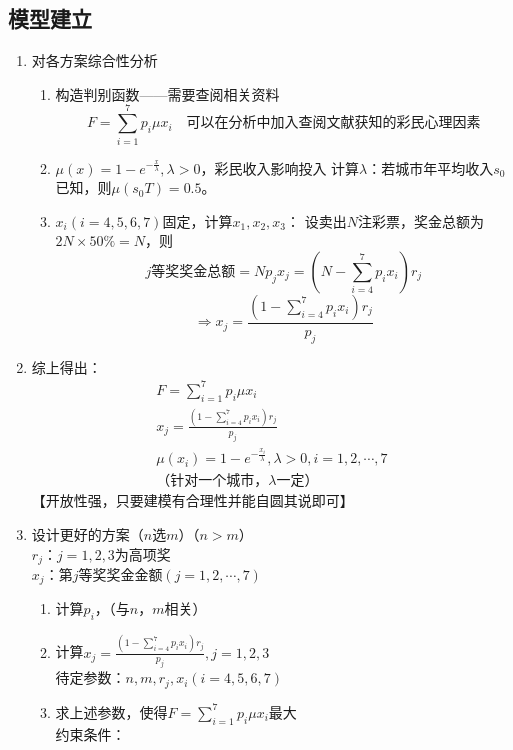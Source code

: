 \subsection{模型建立}
{
	\renewcommand{\labelenumii}{\Roman{enumii}.}
	\renewcommand{\theenumiii}{\arabic{enumiii}}
	\renewcommand{\labelenumiii}{\textcircled{\theenumiii}}
	\begin{enumerate}
		\item 对各方案综合性分析
		\begin{enumerate}
			\item 构造判别函数——需要查阅相关资料
			\[F = \sum_{i=1}^7 p_i \mu{x_i} \quad \text{可以在分析中加入查阅文献获知的彩民心理因素}
			\]
			\item $\mu(x) = 1 - e^{-\frac{x}{\lambda}},\lambda>0$，彩民收入影响投入
			计算$\lambda$：若城市年平均收入$s_0$已知，则$\mu(s_0 T) = 0.5$。
			\item $x_i(i = 4,5,6,7)$固定，计算$x_1,x_2,x_3$：
			设卖出$N$注彩票，奖金总额为$2N\times50\% = N$，则\[
			j\text{等奖奖金总额} = Np_j x_j = \left(N - \sum_{i=4}^{7}p_i x_i\right)r_j
			\]\[
			\Longrightarrow x_j = \frac{(1-\sum_{i=4}^{7}p_i x_i)r_j}{p_j}
			\]
		\end{enumerate}
		\item 综上得出：
		\begin{gather*}
		F = \sum_{i=1}^7 p_i \mu{x_i} \\
		x_j = \frac{(1-\sum_{i=4}^{7}p_i x_i)r_j}{p_j} \\
		\mu(x_i) = 1 - e^{-\frac{x_i}{\lambda}},\lambda > 0,i = 1,2,\cdots,7 \\
		\text{（针对一个城市，$\lambda$一定）}
		\end{gather*}
		【开放性强，只要建模有合理性并能自圆其说即可】
		\item 设计更好的方案（$n$选$m$）（$n>m$） \\
		$r_j$：$j=1,2,3$为高项奖 \\
		$x_j$：第$j$等奖奖金金额$(j = 1,2,\cdots,7)$ \\
		\begin{enumerate}
			\item 计算$p_i$，（与$n$，$m$相关）
			\item 计算$x_j = \frac{(1-\sum_{i=4}^{7}p_i x_i)r_j}{p_j},j = 1,2,3$\\
			待定参数：$n,m,r_j,x_i(i = 4,5,6,7)$
			\item 求上述参数，使得$F = \sum_{i=1}^7 p_i \mu{x_i}$最大\\
			约束条件：
			\begin{enumerate}

\end{enumerate}
\end{enumerate}
\end{enumerate}}
